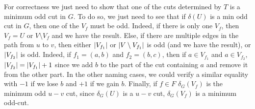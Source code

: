 \documentclass[math, info]{cours}
\begin{document}
For correctness we just need to show that one of the cuts determined by $T$ is a minimum odd cut in $G$.
To do so, we just need to see that if $\delta(U)$ is a min odd cut in $G$, then one of the $V_{f}$ must be odd.
Indeed, if there is only one $V_{f}$, then $V_{f} = U$ or $V \setminus V_{f}$ and we have the result. 
Else, if there are multiple edges in the path from $u$ to $v$, then either $\left|V_{f_{1}}\right|$ or $\left|V \setminus V_{f_{1}}\right|$  is odd (and we have the result), or $\left|V_{f_{2}}\right|$ is odd.
Indeed, if $f_{1} = (a, b)$ and $f_{2} = (b, c)$, then if $a \in V_{f_{1}}$ and $a \in V_{f_{2}}$, $\left|V_{f_{2}}\right| = \left|V_{f_{1}}\right| + 1$ since we add $b$ to the part of the cut containing $a$ and remove it from the other part. 
In the other naming cases, we could verify a similar equality with $-1$ if we lose $b$ and $+1$ if we gain $b$. 
Finally, if $f \in F$ $\delta_{G}(V_{f})$ is the minimum odd $u - v$ cut, since $\delta_{G}(U)$ is a $u-v$ cut, $\delta_{G}(V_{f})$ is a minimum odd-cut.
\end{document}
